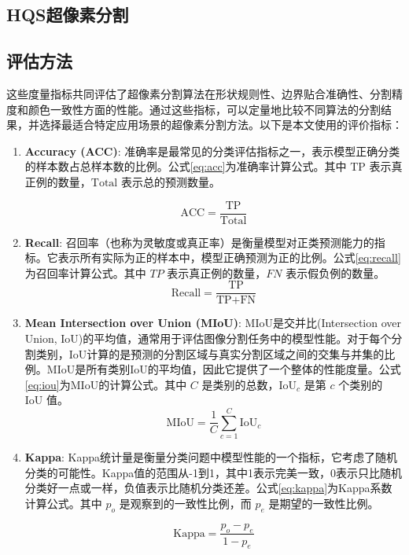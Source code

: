 \subsection{HQS超像素分割}

\subsection{评估方法}
这些度量指标共同评估了超像素分割算法在形状规则性、边界贴合准确性、分割精度和颜色一致性方面的性能。通过这些指标，可以定量地比较不同算法的分割结果，并选择最适合特定应用场景的超像素分割方法。以下是本文使用的评价指标：

\begin{enumerate}
  \item \textbf{\textbf{Accuracy (ACC)}}:
  准确率是最常见的分类评估指标之一，表示模型正确分类的样本数占总样本数的比例。公式\eqref{eq:acc}为准确率计算公式。其中 \( \text{TP} \) 表示真正例的数量，\( \text{Total} \) 表示总的预测数量。

  \begin{equation}
    \text{ACC} = \frac{\text{TP}}{\text{Total}}
    \label{eq:acc}
  \end{equation}


\item \textbf{\textbf{Recall}}:
  召回率（也称为灵敏度或真正率）是衡量模型对正类预测能力的指标。它表示所有实际为正的样本中，模型正确预测为正的比例。公式\eqref{eq:recall}为召回率计算公式。其中 \( TP \) 表示真正例的数量，\( FN \) 表示假负例的数量。
    \begin{equation}
      \text{Recall} = \frac{\text{TP}}{\text{TP} + \text{FN}}
      \label{eq:recall}
    \end{equation}

  \item \textbf{\textbf{Mean Intersection over Union (MIoU)}}:
MIoU是交并比(Intersection over Union, IoU)的平均值，通常用于评估图像分割任务中的模型性能。对于每个分割类别，IoU计算的是预测的分割区域与真实分割区域之间的交集与并集的比例。MIoU是所有类别IoU的平均值，因此它提供了一个整体的性能度量。公式\eqref{eq:iou}为MIoU的计算公式。其中 \( C \) 是类别的总数，\( \text{IoU}_c \) 是第 \( c \) 个类别的 IoU 值。
\begin{equation}
  \text{MIoU} = \frac{1}{C} \sum_{c=1}^{C} \text{IoU}_c
    \label{eq:miou}
  \end{equation}

\item \textbf{\textbf{Kappa}}:
  Kappa统计量是衡量分类问题中模型性能的一个指标，它考虑了随机分类的可能性。Kappa值的范围从-1到1，其中1表示完美一致，0表示只比随机分类好一点或一样，负值表示比随机分类还差。公式\eqref{eq:kappa}为Kappa系数计算公式。其中 \( p_o \) 是观察到的一致性比例，而 \( p_e \) 是期望的一致性比例。

  \begin{equation}
    \text{Kappa} = \frac{p_o - p_e}{1 - p_e}
    \label{eq:kappa}
  \end{equation}

\end{enumerate}

